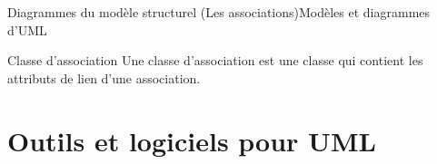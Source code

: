 \documentclass{beamer}
\begin{document}
  \begin{frame}{Diagrammes du modèle structurel (Les associations)}{Modèles et diagrammes d'UML}
    \begin{block}{Classe d'association}
      Une classe d'association est une classe qui contient les attributs de lien d'une association.
    \end{block}

    \begin{Example}
    \end{Example}
  \end{frame}

\section{Outils et logiciels pour UML}
\end{document}

